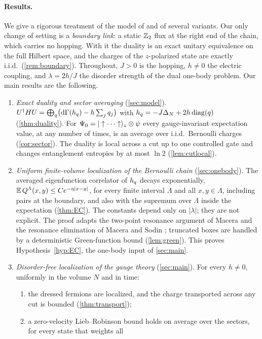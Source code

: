 \paragraph{Results.}
We give a rigorous treatment of the model of \cite{SKKM2017} and of several variants.  Our only change of
setting is a \emph{boundary link}: a static $\mathbb{Z}_2$ flux at the right end of the chain, which carries no
hopping.  With it the duality is an exact unitary equivalence on the full Hilbert space, and the charges of the
$z$-polarized state are exactly i.i.d.\ (\cref{rem:boundary}).  Throughout, $J>0$ is the hopping, $h\neq0$ the
electric coupling, and $\lambda=2h/J$ the disorder strength of the dual one-body problem.  Our main results are
the following.
\begin{enumerate}[label=(\arabic*),leftmargin=2em]
\item \emph{Exact duality and sector averaging} (\cref{sec:model}).  $U^\dagger HU=\bigoplus_q\bigl(\mathrm{d}\Gamma(h_{q})-h\sum_jq_j\bigr)$
with $h_{q}=-J\Delta_N+2h\operatorname{diag}(q)$ (\cref{thm:duality}).  For $\Psi_0=|\uparrow\cdots\uparrow\rangle_z\otimes\psi$ every
gauge-invariant expectation value, at any number of times, is an average over i.i.d.\ Bernoulli charges
(\cref{cor:sector}).  The duality is local across a cut up to one controlled gate and changes entanglement
entropies by at most $\ln2$ (\cref{lem:cutlocal}).
\item \emph{Uniform finite-volume localization of the Bernoulli chain} (\cref{sec:onebody}).  The averaged
eigenfunction correlator of $h_{q}$ decays exponentially, $\mathbb{E}\,Q^\Lambda(x,y)\le Ce^{-\eta|x-y|}$, for every finite
interval $\Lambda$ and all $x,y\in\Lambda$, including pairs at the boundary, and also with the supremum over
$\Lambda$ inside the expectation (\cref{thm:EC}).  The constants depend only on $|\lambda|$; they are not explicit.
The proof adapts the two-point resonance argument of Macera \cite{Macera2023} and the resonance elimination of
Macera and Sodin \cite{MaceraSodin2022}; truncated boxes are handled by a deterministic Green-function bound
(\cref{lem:green}).  This proves Hypothesis~\ref{hyp:EC}, the one-body input of \cref{sec:main}.
\item \emph{Disorder-free localization of the gauge theory} (\cref{sec:main}).  For every $h\neq0$, uniformly in
the volume $N$ and in time:
\begin{enumerate}[label=(\alph*)]
\item the dressed fermions are localized, and the charge transported across any cut is bounded
(\cref{thm:transport});
\item a zero-velocity Lieb--Robinson bound holds on average over the sectors, for every state that weights all

\end{enumerate}
\end{enumerate}
